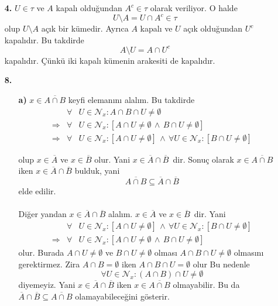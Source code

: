 \documentclass[10pt,a4paper]{article}
\author{Hakan ERGÜL}
\theoremstyle{definition} \newtheorem{teo}{Teorem}
\begin{document}
\begin{enumerate}
\item[\textbf{4.}] $U\in\tau$ ve $ A $ kapalı olduğundan $A ^{c}\in \tau$ olarak veriliyor. O halde 
\begin{displaymath}
U\setminus A = U\cap A^{c} \in \tau
\end{displaymath}
olup $ U\setminus A $ açık bir kümedir. 
Ayrıca $ A $ kapalı ve $ U $ açık olduğundan $ U^{c} $ kapalıdır. Bu takdirde
\begin{displaymath}
A\setminus U=A\cap U^{c}
\end{displaymath}
kapalıdır. Çünkü iki kapalı kümenin arakesiti de kapalıdır.

\item[\textbf{8.}] 
\begin{enumerate}
\item[\textbf{a)}]
$ x\in \overline{A\cap B} $ keyfi elemanını alalım. Bu takdirde
\begin{eqnarray}
&\forall &\!\!\!\!\!U\in \mathcal{N}_{x} :A \cap B\cap U\neq\emptyset \nonumber \\
\Rightarrow &\forall &\!\!\!\!\!U\in \mathcal{N}_{x} :[A \cap U\neq\emptyset\, \wedge\, B\cap U\neq\emptyset]\nonumber \\
\Rightarrow &\forall &\!\!\!\!\!U\in \mathcal{N}_{x} :[A \cap U\neq\emptyset]\, \wedge\, \forall U\in \mathcal{N}_{x} :[B \cap U\neq\emptyset]\nonumber
\end{eqnarray}

olup $ x \in \overline{A} $ ve $ x \in \overline{B} $ olur. Yani $ x \in \overline{A}\cap \overline{B}\, $ dir. Sonuç olarak $ x \in \overline{A\cap B} $ iken $ x \in \overline{A}\cap \overline{B} $ bulduk, yani
\begin{displaymath}
\overline{A\cap B}\subseteq \overline{A}\cap \overline{B}
\end{displaymath}
elde edilir.
   \paragraph{}
Diğer yandan $ x \in \overline{A}\cap \overline{B} $ alalım. $ x \in \overline{A} $ ve $ x \in \overline{B}\, $ dir. Yani
\begin{eqnarray}
&\forall & \!\!\!\!\!U\in \mathcal{N}_{x} :[A \cap U\neq\emptyset]\, \wedge\, \forall U\in \mathcal{N}_{x} :[B \cap U\neq\emptyset]\nonumber \\
\Rightarrow &\forall &\!\!\!\!\!U\in \mathcal{N}_{x} :[A \cap U\neq\emptyset\, \wedge \,B \cap U\neq\emptyset] \nonumber
\end{eqnarray}
olur. Burada $ A\cap U\neq\emptyset $ ve $ B\cap U\neq\emptyset $ olması $ A\cap B\cap U\neq\emptyset $ olmasını gerektirmez. Zira $ A\cap B=\emptyset $ iken $ A\cap B\cap U=\emptyset $ olur Bu nedenle
\begin{displaymath}
\forall U \in \mathcal{N}_{x} : (A\cap B)\cap U\neq\emptyset
\end{displaymath}
diyemeyiz. Yani $ x \in \overline{A}\cap \overline{B} $ iken $ x \in \overline{A\cap B} $ olmayabilir. Bu da $ \overline{A}\cap \overline{B}\subseteq \overline{A\cap B} $ olamayabileceğini gösterir.


\end{enumerate}
\end{enumerate}
\end{document}
